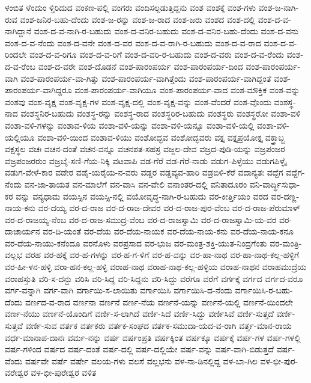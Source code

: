 {ಳಂಬಿತ
ಳೆಂದುಂ
ಳ್ತಿರಿದುದ
ವಂಕಣ-ಪಲ್ಲಿ
ವಂಗರು
ವಂದಿಸಲ್ಪಡುತ್ತಿದ್ದನು
ವಂಶ
ವಂಶಕ್ಕೆ
ವಂಶ-ಗಳು
ವಂಶ-ಜ-ನಾಗಿ-ರುವ
ವಂಶ-ಜನಿರ-ಬಹು-ದೆಂದು
ವಂಶ-ಜ-ರನ್ನು
ವಂಶ-ಜ-ರಾದ
ವಂಶ-ಜರು
ವಂಶದ
ವಂಶ-ದಲ್ಲಿ
ವಂಶ-ದ-ವ-ನಾಗಿದ್ದಾನೆ
ವಂಶ-ದ-ವ-ನಾಗಿ-ರ-ಬಹುದು
ವಂಶ-ದ-ವನಿರ-ಬಹುದು
ವಂಶ-ದ-ವನಿರ-ಬಹು-ದೆಂದು
ವಂಶ-ದ-ವನು
ವಂಶ-ದ-ವ-ನೆಂದು
ವಂಶ-ದ-ವನೇ
ವಂಶ-ದ-ವರ
ವಂಶ-ದ-ವ-ರಾಗಿ-ರ-ಬಹುದು
ವಂಶ-ದ-ವ-ರಾದ
ವಂಶ-ದ-ವ-ರಿಂದಲೇ
ವಂಶ-ದ-ವ-ರಿಗೂ
ವಂಶ-ದ-ವ-ರಿಗೆ
ವಂಶ-ದ-ವರಿ-ರ-ಬಹುದು
ವಂಶ-ದ-ವರು
ವಂಶ-ದ-ವ-ರೆಂದು
ವಂಶ-ದ-ವ-ರೆಂಬ
ವಂಶ-ದ-ವರೇ
ವಂಶ-ದೊಡನೆ
ವಂಶ-ಪಾರಂಪರ್ಯ
ವಂಶ-ಪಾರಂಪರ್ಯ-ದಿಂದ
ವಂಶ-ಪಾರಂಪರ್ಯ-ವಾಗಿ
ವಂಶ-ಪಾರಂಪರ್ಯ-ವಾ-ಗಿತ್ತು
ವಂಶ-ಪಾರಂಪರ್ಯ-ವಾಗಿತ್ತೆಂದು
ವಂಶ-ಪಾರಂಪರ್ಯ-ವಾಗಿದ್ದಂತೆ
ವಂಶ-ಪಾರಂಪರ್ಯ-ವಾಗಿದ್ದರೂ
ವಂಶ-ಪಾರಂಪರ್ಯ-ವಾಗಿಯೂ
ವಂಶ-ಪಾರಂಪರ್ಯ-ವಾದ
ವಂಶ-ಮೌಕ್ತಿಕ
ವಂಶ-ವನ್ನು
ವಂಶವು
ವಂಶ-ವೃಕ್ಷ
ವಂಶ-ವೃಕ್ಷ-ಗಳ
ವಂಶ-ವೃಕ್ಷ-ದಲ್ಲಿ
ವಂಶ-ವೃಕ್ಷ-ವನ್ನು
ವಂಶ-ವೆಂದರೆ
ವಂಶ-ವೊಂದು
ವಂಶಸ್ಥ-ನಾದ
ವಂಶಸ್ಥನಿರ-ಬಹುದು
ವಂಶಸ್ಥ-ರನ್ನು
ವಂಶಸ್ಥ-ರಾದ
ವಂಶಸ್ಥರಿರ-ಬಹುದು
ವಂಶಸ್ಥರು
ವಂಶಸ್ಥರೋ
ವಂಶಾ-ವಳಿ
ವಂಶಾ-ವಳಿ-ಗಳನ್ನು
ವಂಶಾವ-ಳಿಯ
ವಂಶಾ-ವಳಿ-ಯನ್ನು
ವಂಶಾ-ವಳಿ-ಯನ್ನೂ
ವಂಶಾ-ವಳಿ-ಯಲ್ಲಿ
ವಂಶಾ-ವಳಿ-ಯಲ್ಲಿಯೂ
ವಂಶಾ-ವಳಿ-ಯಿಂದ
ವಂಶಾವ-ಳಿಯು
ವಂಶೋದ್ಭವ
ವಂಶೋದ್ಭವರು
ವಕ್ತೃ
ವಕ್ತೃಪ್ರಯೋಕ್ತೃ
ವಕ್ತ್ರಾಬ್ಜ
ವಕ್ಷಸ್ಥಲ
ವಚಃ
ವಚನ-ದಂತೆ
ವಚನ-ವನ್ನೂ
ವಚನಶತ-ಸಹಸ್ರ
ವಜ್ಜಲ-ದೇವ
ವಜ್ರದ-ಪುಡಿ-ಯನ್ನು
ವಜ್ರಪಂಜರ
ವಜ್ರಪಂಜರರುಂ
ವಜ್ರಬೈ-ಸಣಿ-ಗೆಯ-ನಿಕ್ಕಿ
ವಟವಾಪಿ
ವಡ-ಗೆರೆ
ವಡ-ಗೆರೆ-ನಾಡು
ವಡುಗ-ಪಿಳ್ಳೆಯು
ವಡುಗಪಿಳ್ಳೈ
ವಡುಗ-ವೇಳೆ-ಕಾರ
ವಡೇರ
ವಡೈ-ಯರೈಯ-ನ-ವರು
ವಡ್ಡರ
ವಡ್ಡವ್ಯವ-ಹಾರಿ
ವಡ್ರಬಿಳಿ-ಕೆರೆ
ವದಾನ್ಯತಃ
ವದ್ದೆಗ
ವದ್ದೆಗ-ನೆಂದು
ವನ-ಜಾ-ತಾಯತ
ವನ-ಮಾಲೆಗೆ
ವನ-ವಾಸಿ
ವನ-ವೇಲಿ
ವನಾಂತರ-ದಲ್ಲಿ
ವನಿತಾದೂರಂ
ವನಿ-ವಾರ್ದ್ಧಿಸುಧಾ-ಕರ
ವನ್ನು
ವನ್ಯಧಾಮ
ವಯಸ್ಸಿನ
ವಯಸ್ಸಿ-ನಲ್ಲಿ
ವಯೋವೃದ್ಧ-ನಾಗಿ-ರ-ಬಹುದು
ವರ-ಕೀರ್ತ್ತಿಯಂ
ವರದ
ವರ-ದಣ್ಣ-ನಾಯ-ಕನು
ವರ-ದಯ್ಯ
ವರ-ದ-ರಾಜ
ವರ-ದ-ರಾಜ-ದೇವರ
ವರ-ದ-ರಾಜ-ಪುರ-ವೆಂಬ
ವರ-ದ-ರಾಜ-ಪೆರುಮಾಳ್
ವರ-ದ-ರಾಜಯ್ಯ-ನೆಂಬ
ವರ-ದ-ರಾಜ-ಸಮುದ್ರ-ವೆಂಬ
ವರ-ದ-ರಾಜಸ್ವಾಮಿ
ವರ-ದ-ರಾಜಸ್ವಾಮಿ-ಯ-ವರ
ವರ-ದಾಚಾರ್ಯನ
ವರ-ದಿ-ಯಂತೆ
ವರ-ದೆಯ
ವರ-ದೆಯ-ನಾಯಕ
ವರ-ದೆಯ-ನಾಯ-ಕನು
ವರ-ದೆಯ-ನಾಯ-ಕನೂ
ವರ-ದೆಯ-ನಾಯು-ಕನೆಂದೂ
ವರನೊಳು
ವರಪ್ರಸಾದ
ವರ-ಭುಜ
ವರ-ಮಂತ್ರ-ಶಕ್ತಿ-ಯುತ-ನಿಂದ್ರಗೆಂತು
ವರ-ಮಂತ್ರಿ-ವಲ್ಲಭ
ವರಹ
ವರ-ಹಕ್ಕೆ
ವರ-ಹ-ಗಳನ್ನು
ವರ-ಹ-ಗ-ಳಿಗೆ
ವರ-ಹ-ವನ್ನು
ವರ-ಹಾ-ನಾಥ
ವರ-ಹಾ-ನಾಥ-ಕಲ್ಲ-ಹಳ್ಳಿಗೆ
ವರ-ಹೀ-ಳನ-ಹಳ್ಳಿ
ವರಾ-ಹನ-ಕಲ್ಲ-ಹಳ್ಳಿ
ವರಾಹ-ನಾಥ
ವರಾಹ-ನಾಥ-ಕಲ್ಲ-ಹಳ್ಳಿಯ
ವರಾಹ-ನಾಥನ
ವರಾಹಮುದ್ರೆಯ
ವರಾಹಸ್ತುತಿ
ವರಿ-ಸ-ದನ್ದು
ವರಿಸಿ
ವರಿ-ಸಿದ್ದ
ವರಿ-ಸಿದ್ದನು
ವರಿ-ಸಿದ್ದು
ವರೆಗೂ
ವರೆಗೆ
ವರ್ಗಕ್ಕೆ
ವರ್ಗದ
ವರ್ಗದ-ವರೂ
ವರ್ಗ-ವನ್ನಾಗಿ
ವರ್ಗ-ವಾಗಿ
ವರ್ಗಾಯಿ-ಸ-ಲಾಯಿತು
ವರ್ಗಾಯಿಸಿ
ವರ್ಗಾಯಿಸಿ-ದ-ನೆಂದು
ವರ್ಗಾಯಿಸಿ-ರ-ಬಹು-ದೆಂದು
ವರ್ಣದ-ವ-ರಾದ
ವರ್ಣನಾ
ವರ್ಣನೆ
ವರ್ಣ-ನೆಯ
ವರ್ಣನೆ-ಯನ್ನು
ವರ್ಣನೆ-ಯಲ್ಲಿ
ವರ್ಣನೆ-ಯಿಂದಲೇ
ವರ್ಣ-ನೆಯು
ವರ್ಣನೆ-ಯೊಂದಿಗೆ
ವರ್ಣಿ-ಸ-ಲಾಗಿದೆ
ವರ್ಣಿ-ಸಿದೆ
ವರ್ಣಿ-ಸಿದ್ದು
ವರ್ಣಿಸಿವೆ
ವರ್ಣಿ-ಸುತ್ತದೆ
ವರ್ಣಿ-ಸುತ್ತವೆ
ವರ್ಣಿ-ಸುವ
ವರ್ತಕ
ವರ್ತಕರು
ವರ್ತಕ-ಸಂಘದ
ವರ್ತಕ-ಸಮುದಾ-ಯದ-ವ-ರಾಗಿ
ವರ್ತ್ತ-ಮಾನ-ರಾಯ
ವರ್ಧ-ಮಾನಾಪ-ದಾನಃ
ವರ್ಮ-ನನ್ನು
ವರ್ಷ
ವರ್ಷಂಪ್ರತಿ
ವರ್ಷಕ್ಕಿಂತ
ವರ್ಷಕ್ಕೂ
ವರ್ಷಕ್ಕೆ
ವರ್ಷ-ಗಳ
ವರ್ಷ-ಗಳಲ್ಲಿ
ವರ್ಷ-ಗಳಿಂದ
ವರ್ಷದ
ವರ್ಷ-ದಂತೆ
ವರ್ಷ-ದಲ್ಲಿ
ವರ್ಷ-ದಲ್ಲಿಯೇ
ವರ್ಷ-ವನ್ನು
ವರ್ಷ-ವಾಗಿ-ಬಿಡುತ್ತದೆ
ವರ್ಷ-ವೆಂದು
ವರ್ಷವೇ
ವರ್ಷೆ
ವರ್ಷೇ
ವಲಯ-ಗಳು
ವಲಸೆ
ವಲ್ಲಭನು
ವಳ-ನಾ-ಡಿನಲ್ಲಿದ್ದ
ವಳ-ಬಾ-ಗಿಲ
ವಳ-ಭೀ-ಪುರ-ವರೇಶ್ವರ
ವಳ-ಭೀ-ಪುರೇಶ್ವರ
ವಳಿತ
}
